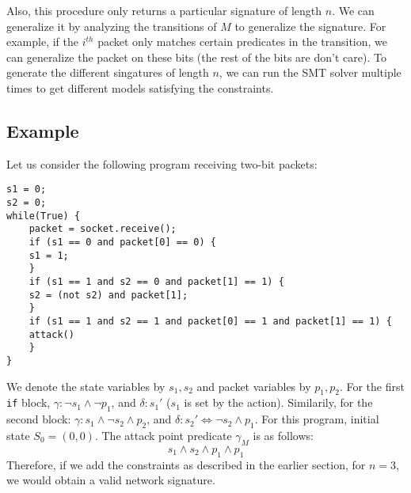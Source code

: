 \documentclass[]{article}
\begin{document}
Also, this procedure only returns a particular signature
of length $n$. We can generalize it by analyzing the 
transitions of $M$ to generalize the signature. For
example, if the $i^{th}$ packet only matches certain 
predicates in the transition, we can generalize the packet on
these bits (the rest of the bits are don't care). To 
generate the different singatures of length $n$, 
we can run the SMT solver multiple times to get different 
models satisfying the constraints.

\subsection{Example}
Let us consider the following program receiving two-bit packets:
\begin{lstlisting}	
s1 = 0;
s2 = 0;
while(True) {
	packet = socket.receive();
	if (s1 == 0 and packet[0] == 0) {
	s1 = 1;
	}
	if (s1 == 1 and s2 == 0 and packet[1] == 1) {
	s2 = (not s2) and packet[1];
	}
	if (s1 == 1 and s2 == 1 and packet[0] == 1 and packet[1] == 1) {
	attack()  
	}	
}
\end{lstlisting}	
We denote the state variables by $s_1, s_2$ and packet 
variables by $p_1, p_2$.
For the first \texttt{if} block, 
$\gamma: \neg s_1 \wedge \neg p_1$, and $\delta: s_1'$ ($s_1$ 
is set by the action). Similarily,
for the second block: 
$\gamma: s_1 \wedge \neg s_2 \wedge p_2$, and $\delta: 
s_2' \Leftrightarrow \neg s_2 \wedge p_1$.
For this program, initial state $S_0 = (0, 0)$.
The attack point predicate $\gamma_M$ is as follows:
\begin{equation}
	s_1 \wedge s_2 \wedge p_1 \wedge p_1
\end{equation}
Therefore, if we add the constraints as described in the 
earlier section, for $n=3$, we would obtain a
valid network signature. 





\end{document}
